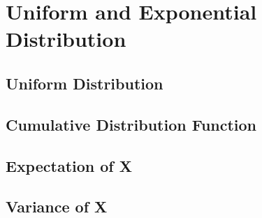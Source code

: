 \chapter{Uniform and Exponential Distribution}
\label{chap:uniform-and-exponential-distribution}

\section{Uniform Distribution}
\label{sec:uniform-distribution}

\begin{eg}

\end{eg}

\begin{definition}
  \label{def:uniform-distribution}

\end{definition}

\section{Cumulative Distribution Function}
\label{sec:cumulative-distribution-function-uniform-distribution}

\section{Expectation of X}
\label{sec:expectation-of-x-ud}

\section{Variance of X}
\label{sec-variance-of-x-ud}
